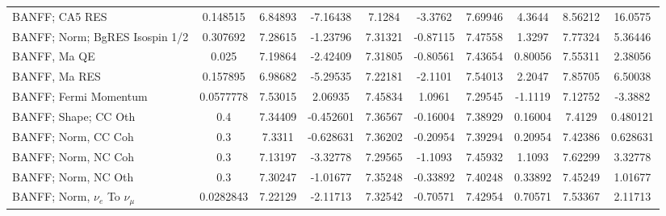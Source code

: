 \begin{tabular}{| l | S | S  S | S  S | S  S | S  S | }
                                                                  BANFF; CA5 RES &        0.148515 &         6.84893 &        -7.16438 &          7.1284 &         -3.3762 &         7.69946 &          4.3644 &         8.56212 &         16.0575 \\ 
                                                  BANFF; Norm; BgRES Isospin 1/2 &        0.307692 &         7.28615 &        -1.23796 &         7.31321 &        -0.87115 &         7.47558 &          1.3297 &         7.77324 &         5.36446 \\ 
                                                                    BANFF, Ma QE &           0.025 &         7.19864 &        -2.42409 &         7.31805 &        -0.80561 &         7.43654 &         0.80056 &         7.55311 &         2.38056 \\ 
                                                                   BANFF, Ma RES &        0.157895 &         6.98682 &        -5.29535 &         7.22181 &         -2.1101 &         7.54013 &          2.2047 &         7.85705 &         6.50038 \\ 
                                                           BANFF; Fermi Momentum &       0.0577778 &         7.53015 &         2.06935 &         7.45834 &          1.0961 &         7.29545 &         -1.1119 &         7.12752 &         -3.3882 \\ 
                                                            BANFF; Shape; CC Oth &             0.4 &         7.34409 &       -0.452601 &         7.36567 &        -0.16004 &         7.38929 &         0.16004 &          7.4129 &        0.480121 \\ 
                                                             BANFF; Norm, CC Coh &             0.3 &          7.3311 &       -0.628631 &         7.36202 &        -0.20954 &         7.39294 &         0.20954 &         7.42386 &        0.628631 \\ 
                                                             BANFF; Norm, NC Coh &             0.3 &         7.13197 &        -3.32778 &         7.29565 &         -1.1093 &         7.45932 &          1.1093 &         7.62299 &         3.32778 \\ 
                                                             BANFF; Norm, NC Oth &             0.3 &         7.30247 &        -1.01677 &         7.35248 &        -0.33892 &         7.40248 &         0.33892 &         7.45249 &         1.01677 \\ 
                                           BANFF; Norm, $\nu_{e}$ To $\nu_{\mu}$ &       0.0282843 &         7.22129 &        -2.11713 &         7.32542 &        -0.70571 &         7.42954 &         0.70571 &         7.53367 &         2.11713 \\ 

\end{tabular}

